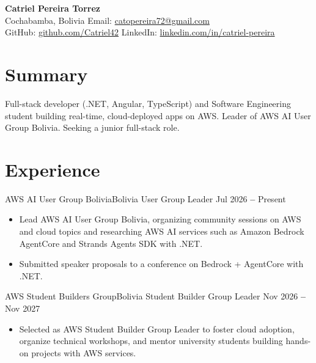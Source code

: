 \documentclass{OpenCV}
\begin{document}
\begin{center}
    {\LARGE \textbf{Catriel Pereira Torrez}} \\[6pt]
    Cochabamba, Bolivia \qquad Email: \href{mailto:catopereira72@gmail.com}{catopereira72@gmail.com} \\[3pt]
    GitHub: \href{https://github.com/Catriel42}{github.com/Catriel42} \qquad LinkedIn: \href{https://www.linkedin.com/in/catriel-pereira}{linkedin.com/in/catriel-pereira}
\end{center}
\vspace{6pt}

\section*{Summary}
Full-stack developer (.NET, Angular, TypeScript) and Software Engineering student building real-time, cloud-deployed apps on AWS. Leader of AWS AI User Group Bolivia. Seeking a junior full-stack role.

\section*{Experience}
\resumeSubHeadingListStart

\resumeSubheading
{AWS AI User Group Bolivia}{Bolivia}
{User Group Leader}
{Jul 2026 \textbf{--} Present}

\begin{itemize}
    \item Lead AWS AI User Group Bolivia, organizing community sessions on AWS and cloud topics and researching AWS AI services such as Amazon Bedrock AgentCore and Strands Agents SDK with .NET.
    \item Submitted speaker proposals to a conference on Bedrock + AgentCore with .NET.
\end{itemize}

\resumeSubheading
{AWS Student Builders Group}{Bolivia}
{Student Builder Group Leader}
{Nov 2026 \textbf{--} Nov 2027}

\begin{itemize}
    \item Selected as AWS Student Builder Group Leader to foster cloud adoption, organize technical workshops, and mentor university students building hands-on projects with AWS services.
\end{itemize}

\resumeSubHeadingListEnd










\end{document}
